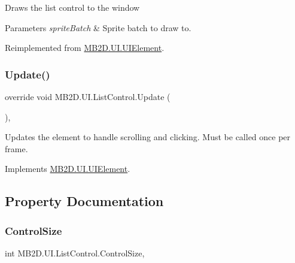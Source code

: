 Draws the list control to the window 


\begin{DoxyParams}{Parameters}
{\em sprite\+Batch} & Sprite batch to draw to.\\
\hline
\end{DoxyParams}


Reimplemented from \hyperlink{class_m_b2_d_1_1_u_i_1_1_u_i_element_afec98e6e38cb0dbc17a5db6d6a3d5ba5}{M\+B2\+D.\+U\+I.\+U\+I\+Element}.

\hypertarget{class_m_b2_d_1_1_u_i_1_1_list_control_a48587bc052ca0d3d28bd968369024e14}{}\label{class_m_b2_d_1_1_u_i_1_1_list_control_a48587bc052ca0d3d28bd968369024e14} 
\subsubsection{\texorpdfstring{Update()}{Update()}}
{\footnotesize\ttfamily override void M\+B2\+D.\+U\+I.\+List\+Control.\+Update (\begin{DoxyParamCaption}{ }\end{DoxyParamCaption})\hspace{0.3cm}{\ttfamily [inline]}, {\ttfamily [virtual]}}



Updates the element to handle scrolling and clicking. Must be called once per frame. 



Implements \hyperlink{class_m_b2_d_1_1_u_i_1_1_u_i_element_aa97bcbe44f3fac8a13e2febca23b2d4d}{M\+B2\+D.\+U\+I.\+U\+I\+Element}.



\subsection{Property Documentation}
\hypertarget{class_m_b2_d_1_1_u_i_1_1_list_control_aafbb7c455f4ba9832be33a603287ed08}{}\label{class_m_b2_d_1_1_u_i_1_1_list_control_aafbb7c455f4ba9832be33a603287ed08} 
\subsubsection{\texorpdfstring{Control\+Size}{ControlSize}}
{\footnotesize\ttfamily int M\+B2\+D.\+U\+I.\+List\+Control.\+Control\+Size\hspace{0.3cm}{\ttfamily [get]}, {\ttfamily [set]}}



